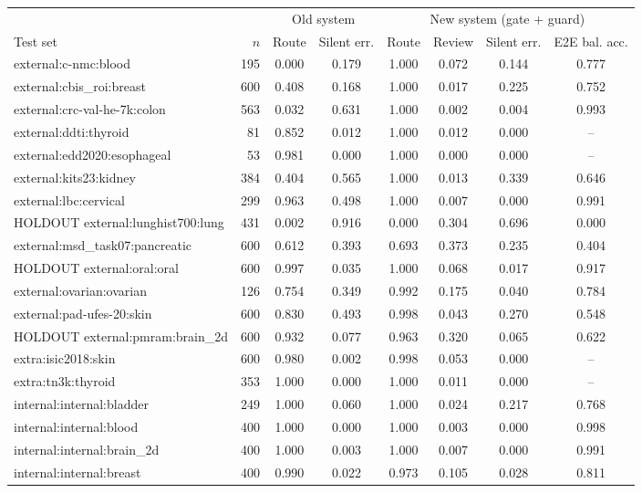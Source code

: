 \begin{tabular}{@{}lrcccccc@{}}
\toprule
 & & \multicolumn{2}{c}{Old system} & \multicolumn{4}{c}{New system (gate + guard)} \\ \cmidrule(lr){3-4}\cmidrule(l){5-8}
Test set & $n$ & Route & Silent err. & Route & Review & Silent err. & E2E bal. acc. \\
\midrule
external:c-nmc:blood & 195 & 0.000 & 0.179 & 1.000 & 0.072 & 0.144 & 0.777 \\
external:cbis\_roi:breast & 600 & 0.408 & 0.168 & 1.000 & 0.017 & 0.225 & 0.752 \\
external:crc-val-he-7k:colon & 563 & 0.032 & 0.631 & 1.000 & 0.002 & 0.004 & 0.993 \\
external:ddti:thyroid & 81 & 0.852 & 0.012 & 1.000 & 0.012 & 0.000 & -- \\
external:edd2020:esophageal & 53 & 0.981 & 0.000 & 1.000 & 0.000 & 0.000 & -- \\
external:kits23:kidney & 384 & 0.404 & 0.565 & 1.000 & 0.013 & 0.339 & 0.646 \\
external:lbc:cervical & 299 & 0.963 & 0.498 & 1.000 & 0.007 & 0.000 & 0.991 \\
HOLDOUT external:lunghist700:lung & 431 & 0.002 & 0.916 & 0.000 & 0.304 & 0.696 & 0.000 \\
external:msd\_task07:pancreatic & 600 & 0.612 & 0.393 & 0.693 & 0.373 & 0.235 & 0.404 \\
HOLDOUT external:oral:oral & 600 & 0.997 & 0.035 & 1.000 & 0.068 & 0.017 & 0.917 \\
external:ovarian:ovarian & 126 & 0.754 & 0.349 & 0.992 & 0.175 & 0.040 & 0.784 \\
external:pad-ufes-20:skin & 600 & 0.830 & 0.493 & 0.998 & 0.043 & 0.270 & 0.548 \\
HOLDOUT external:pmram:brain\_2d & 600 & 0.932 & 0.077 & 0.963 & 0.320 & 0.065 & 0.622 \\
extra:isic2018:skin & 600 & 0.980 & 0.002 & 0.998 & 0.053 & 0.000 & -- \\
extra:tn3k:thyroid & 353 & 1.000 & 0.000 & 1.000 & 0.011 & 0.000 & -- \\
internal:internal:bladder & 249 & 1.000 & 0.060 & 1.000 & 0.024 & 0.217 & 0.768 \\
internal:internal:blood & 400 & 1.000 & 0.000 & 1.000 & 0.003 & 0.000 & 0.998 \\
internal:internal:brain\_2d & 400 & 1.000 & 0.003 & 1.000 & 0.007 & 0.000 & 0.991 \\
internal:internal:breast & 400 & 0.990 & 0.022 & 0.973 & 0.105 & 0.028 & 0.811 \\

\end{tabular}
